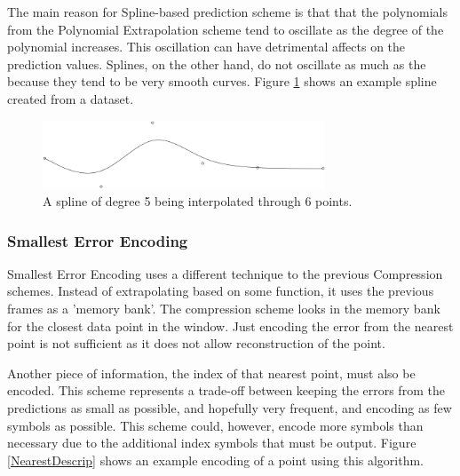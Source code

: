 \documentclass[a4paper,11pt]{report}
\begin{document}
The main reason for Spline-based prediction scheme is that that the polynomials from the Polynomial Extrapolation scheme tend to oscillate as the degree of the polynomial increases. This oscillation can have detrimental affects on the prediction values. Splines, on the other hand, do not oscillate as much as the because they tend to be very smooth curves. Figure \ref{SplineDescrip} shows an example spline created from a dataset.

\begin{figure}
 \center
 \includegraphics[width=0.75\textwidth]{resources/SplineInterpolation.png}
\caption{A spline of degree 5 being interpolated through 6 points. }
\label{SplineDescrip}
\end{figure}

\subsubsection{Smallest Error Encoding}

Smallest Error Encoding uses a different technique to the previous Compression schemes. Instead of extrapolating based on some function, it uses the previous frames as a 'memory bank'. The compression scheme looks in the memory bank for the closest data point in the window. Just encoding the error from the nearest point is not sufficient as it does not allow reconstruction of the point.

Another piece of information, the index of that nearest point, must also be encoded. This scheme represents a trade-off between keeping the errors from the predictions as small as possible, and hopefully very frequent, and encoding as few symbols as possible. This scheme could, however, encode more symbols than necessary due to the additional index symbols that must be output. Figure \ref{NearestDescrip} shows an example encoding of a point using this algorithm.
\end{document}

